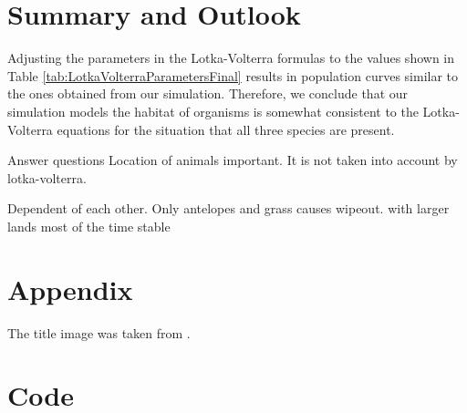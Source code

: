 \documentclass[11pt]{article}
\begin{document}
\section{Summary and Outlook}

Adjusting the parameters in the Lotka-Volterra formulas to the values shown in Table \ref{tab:LotkaVolterraParametersFinal} results in  population curves similar to the ones obtained from our simulation. Therefore, we conclude that our simulation models the habitat of organisms is somewhat consistent to the Lotka-Volterra equations for the situation that all three species are present.


Answer questions
Location of animals important. It is not taken into account by lotka-volterra.

Dependent of each other. 
Only antelopes and grass causes wipeout. with larger lands most of the time stable

 

\appendix

\section{Appendix}
The title image was taken from \cite{titleImage}.

\section{Code}



\end{document}
